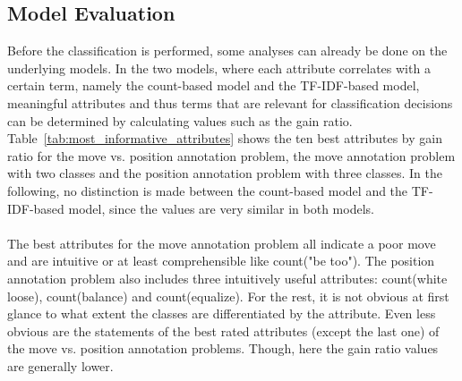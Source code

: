 \documentclass[article,type=msc,colorback,accentcolor=tud7b]{tudthesis}
\begin{document}
  \subsection{Model Evaluation}    
    Before the classification is performed, some analyses can already be done on the underlying models. In the two models, where each attribute correlates with a certain term, namely the count-based model and the TF-IDF-based model, meaningful attributes and thus terms that are relevant for classification decisions can be determined by calculating values such as the gain ratio. Table~\ref{tab:most_informative_attributes} shows the ten best attributes by gain ratio for the move vs. position annotation problem, the move annotation problem with two classes and the position annotation problem with three classes. In the following, no distinction is made between the count-based model and the TF-IDF-based model, since the values are very similar in both models. \\\\
    The best attributes for the move annotation problem all indicate a poor move and are intuitive or at least comprehensible like count("be too"). The position annotation problem also includes three intuitively useful attributes: count(white loose), count(balance) and count(equalize). For the rest, it is not obvious at first glance to what extent the classes are differentiated by the attribute. Even less obvious are the statements of the best rated attributes (except the last one) of the move vs. position annotation problems. Though, here the gain ratio values are generally lower.
    
\end{document}

